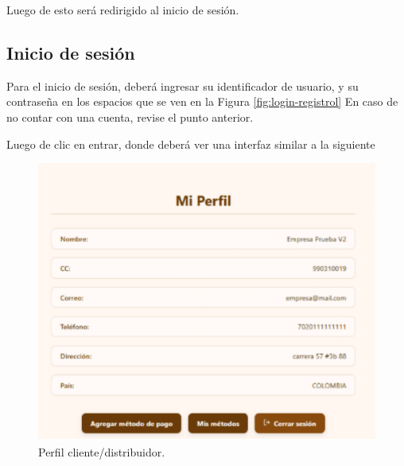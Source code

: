 Luego de esto será redirigido al inicio de sesión.

\subsection{Inicio de sesión}
Para el inicio de sesión, deberá ingresar su identificador de usuario, y su contraseña en los espacios que se ven en la Figura \ref{fig:login-registrol} En caso de no contar con una cuenta, revise el punto anterior.

Luego de clic en entrar, donde deberá ver una interfaz similar a la siguiente

\begin{figure}[H]
    \centering
\includegraphics[width=0.6\linewidth]{acceso/cliente-perfil.png}
\caption{Perfil cliente/distribuidor.}
\label{fig:cliente-perfil}
\end{figure}
